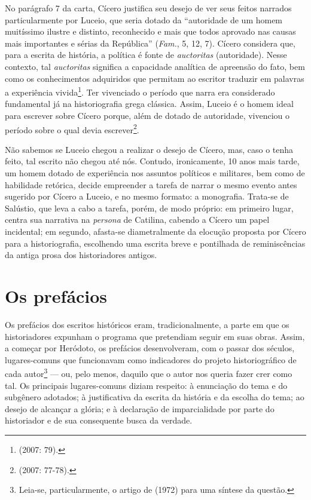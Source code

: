 No parágrafo 7 da carta, Cícero justifica seu desejo de ver seus feitos
narrados particularmente por Luceio, que seria dotado da “autoridade de um homem
muitíssimo ilustre e distinto, reconhecido e mais que todos aprovado nas causas
mais importantes e sérias da República” (\emph{Fam.}, 5, 12, 7). Cícero
considera que, para a escrita de história, a política é fonte de
\emph{auctoritas} (autoridade).  Nesse contexto, tal \emph{auctoritas}
significa a capacidade analítica de apreensão do fato, bem como os conhecimentos
adquiridos que permitam ao escritor traduzir em palavras a experiência
vivida\footnote{  (2007: 79).}. Ter vivenciado o período que narra
era considerado fundamental já na historiografia grega clássica. Assim, Luceio
é o homem ideal para escrever sobre Cícero porque, além de dotado de
autoridade, vivenciou o período sobre o qual devia escrever\footnote{ (2007: 77-78).}.



Não sabemos se Luceio chegou a realizar o desejo de Cícero, mas, caso o tenha
feito, tal escrito não chegou até nós. Contudo, ironicamente, 10 anos mais
tarde, um homem dotado de experiência nos assuntos políticos e militares, bem
como de habilidade retórica, decide empreender a tarefa de narrar o mesmo evento antes
sugerido por Cícero a Luceio, e no mesmo formato: a monografia. Trata-se de
Salústio, que leva a cabo a tarefa, porém, de modo próprio: em primeiro lugar,
centra sua narrativa na \emph{persona} de Catilina, cabendo a Cícero um papel
incidental; em segundo, afasta-se diametralmente da elocução proposta por
Cícero para a historiografia, escolhendo uma escrita breve e pontilhada de
reminiscências da antiga prosa dos historiadores antigos.

 
\section{Os prefácios}


Os prefácios dos escritos históricos eram, tradicionalmente, a parte em que os
historiadores expunham o programa que pretendiam seguir em suas obras. Assim, a
começar por Heródoto, os prefácios desenvolveram, com o passar dos séculos,
lugares-comuns que funcionavam como indicadores do projeto historiográfico de
cada autor\footnote{Leia-se, particularmente, o artigo de  (1972) para uma
síntese da questão.} --- ou, pelo menos, daquilo que o autor nos queria fazer
crer como tal. Os principais lugares-comuns diziam respeito: à enunciação do
tema e do subgênero adotados; à justificativa da escrita da história e da
escolha do tema; ao desejo de alcançar a glória; e à declaração de
imparcialidade por parte do historiador e de sua consequente busca da verdade.  

